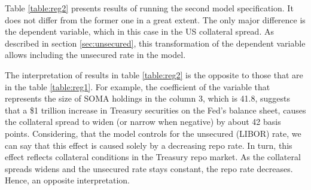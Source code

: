 \documentclass[11pt,a4paper,english,oneside]{article}
\begin{document}
Table \ref{table:reg2} presents results of running the second model specification. It does not differ from the former one in a great extent. The only major difference is the dependent variable, which in this case in the US collateral spread. As described in section \ref{sec:unsecured}, this transformation of the dependent variable allows including the unsecured rate in the model.

The interpretation of results in table \ref{table:reg2} is the opposite to those that are in the table \ref{table:reg1}. For example, the coefficient of the variable that represents the size of SOMA holdings in the column 3, which is 41.8, suggests that a \$1 trillion increase in Treasury securities on the Fed's balance sheet, causes the collateral spread to widen (or narrow when negative) by about 42 basis points. Considering, that the model controls for the unsecured (LIBOR) rate, we can say that this effect is caused solely by a decreasing repo rate. In turn, this effect reflects collateral conditions in the Treasury repo market. As the collateral spreads widens and the unsecured rate stays constant, the repo rate decreases. Hence, an opposite interpretation.

\end{document}
